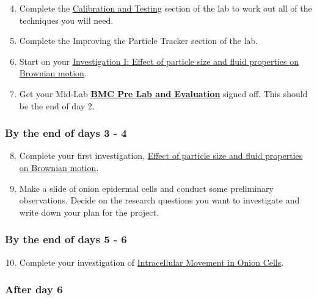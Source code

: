 \documentclass{../lab}
\begin{document}
\begin{enumerate}
    \setcounter{enumi}{3}
    \item Complete the \hyperref[sec:CalibrationAndTesting]{Calibration and Testing} section of the lab to work out all of the techniques you will need.

    \item Complete the Improving the Particle Tracker section of the lab.
    
    \item Start on your \hyperref[sec:InvestigationI]{Investigation I: Effect of particle size and fluid properties on Brownian motion}.
    
    \item Get your Mid-Lab \href{http://experimentationlab.berkeley.edu/BMCPreLab}{\textbf{BMC Pre Lab and Evaluation}} signed off. This should be the end of day 2.
\end{enumerate}

\subsubsection{By the end of days 3 - 4}

\begin{enumerate}
    \setcounter{enumi}{7}
    \item Complete your first investigation, \hyperref[sec:InvestigationI]{Effect of particle size and fluid properties on Brownian motion}.

    \item Make a slide of onion epidermal cells and conduct some preliminary observations. Decide on the research questions you want to investigate and write down your plan for the project.
\end{enumerate}

\subsubsection{By the end of days 5 - 6}

\begin{enumerate}
    \setcounter{enumi}{9}
    \item Complete your investigation of \hyperref[sec:InvestigationII]{Intracellular Movement in Onion Cells}.
\end{enumerate}

\subsubsection{After day 6}
\end{document}
